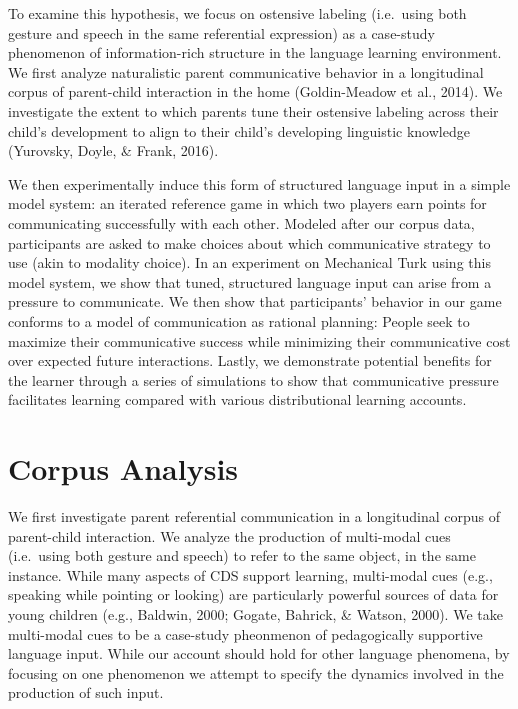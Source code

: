 \documentclass[english,,man,floatsintext]{apa6}
\begin{document}
To examine this hypothesis, we focus on ostensive labeling (i.e.~using both gesture and speech in the same referential expression) as a case-study phenomenon of information-rich structure in the language learning environment. We first analyze naturalistic parent communicative behavior in a longitudinal corpus of parent-child interaction in the home (Goldin-Meadow et al., 2014). We investigate the extent to which parents tune their ostensive labeling across their child's development to align to their child's developing linguistic knowledge (Yurovsky, Doyle, \& Frank, 2016).

We then experimentally induce this form of structured language input in a simple model system: an iterated reference game in which two players earn points for communicating successfully with each other. Modeled after our corpus data, participants are asked to make choices about which communicative strategy to use (akin to modality choice). In an experiment on Mechanical Turk using this model system, we show that tuned, structured language input can arise from a pressure to communicate. We then show that participants' behavior in our game conforms to a model of communication as rational planning: People seek to maximize their communicative success while minimizing their communicative cost over expected future interactions. Lastly, we demonstrate potential benefits for the learner through a series of simulations to show that communicative pressure facilitates learning compared with various distributional learning accounts.

\hypertarget{corpus-analysis}{%
\section{Corpus Analysis}\label{corpus-analysis}}

We first investigate parent referential communication in a longitudinal corpus of parent-child interaction. We analyze the production of multi-modal cues (i.e.~using both gesture and speech) to refer to the same object, in the same instance. While many aspects of CDS support learning, multi-modal cues (e.g., speaking while pointing or looking) are particularly powerful sources of data for young children (e.g., Baldwin, 2000; Gogate, Bahrick, \& Watson, 2000). We take multi-modal cues to be a case-study pheonmenon of pedagogically supportive language input. While our account should hold for other language phenomena, by focusing on one phenomenon we attempt to specify the dynamics involved in the production of such input.
\end{document}
